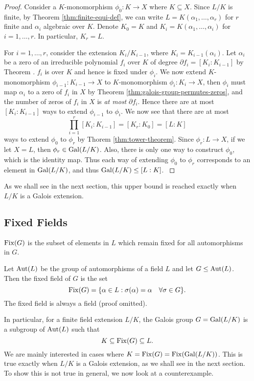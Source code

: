 \begin{proof}
	Consider a $K$-monomorphism $\phi_0 : K \to X$ where $K \subseteq X$. Since $L/K$ is finite, by Theorem \ref{thm:finite-equi-def}, we can write $L = K(\alpha_1, \ldots, \alpha_r)$ for $r$ finite and $\alpha_i$ algebraic over $K$. Denote $K_0 = K$ and
	$K_i = K(\alpha_1, \dots, \alpha_i)$ for $i = 1, \ldots, r$. In particular, $K_r = L$. 
	
	
	For $i = 1, \ldots, r$, consider the extension $K_i / K_{i-1}$, where $K_i = K_{i-1} (\alpha_i)$. Let $\alpha_i$ be a zero of an irreducible polynomial $f_i$ over $K$ of degree $\partial f_i = [K_i : K_{i-1}]$ by Theorem \TODO. $f_i$ is over $K$ and hence is fixed under $\phi_i$. We now extend $K$-monomorphism $\phi_{i-1} : K_{i-1} \to X$ to $K$-monomorphism $\phi_i: K_i \to X$, then $\phi_i$ must map $\alpha_i$ to a zero of $f_i$ in $X$ by Theorem \ref{thm:galois-group-permutes-zeros}, and the number of zeros of $f_i$ in $X$ is \textit{at most} $\partial f_i$. Hence there are at most $[K_i : K_{i-1}]$ ways to extend $\phi_{i-1}$ to $\phi_i$. We now see that there are at most $$\prod_{i=1} ^r [K_i : K_{i-1}] = [K_r : K_0] = [L : K]$$ ways to extend $\phi_0$ to $\phi_r$ by Thorem \ref{thm:tower-theorem}. Since $\phi_r : L \to X$, if we let $X = L$, then $\phi_r \in \operatorname{Gal}(L/K)$. Also, there is only one way to construct $\phi_0$, which is the identity map. Thus each way of extending $\phi_0$ to $\phi_r$ corresponds to an element in $\operatorname{Gal}(L/K)$, and thus $\operatorname{Gal}(L/K) \le [L:K]$.  \cite{galois-theory-lectures}
\end{proof}

As we shall see in the next section, this upper bound is reached exactly when $L/K$ is a Galois extension. 


\subsection{Fixed Fields}
 $\operatorname{Fix}(G)$ is the subset of elements in $L$ which remain fixed for all automorphisms in $G$.
\begin{definition}
    Let $\operatorname{Aut}(L)$ be the group of automorphisms of a field $L$ and let $G \leq \operatorname{Aut}(L)$. Then the fixed field of $G$ is the set $$\operatorname{Fix}(G) = \{ \alpha \in L : \sigma(\alpha) = \alpha \quad \forall \sigma \in G \}. $$ The fixed field is always a field (proof omitted).
\end{definition}

In particular, for a finite field extension $L/ K$, the Galois group $G = \operatorname{Gal}(L / K)$ is a subgroup of $\operatorname{Aut}(L)$ such that $$K \subseteq \operatorname{Fix}(G) \subseteq L. $$ We are mainly interested in cases where $K = \operatorname{Fix}(G) = \operatorname{Fix}(\operatorname{Gal}(L/K))$. This is true exactly when $L/K$ is a Galois extension, as we shall see in the next section. To show this is not true in general, we now look at a counterexample. 

